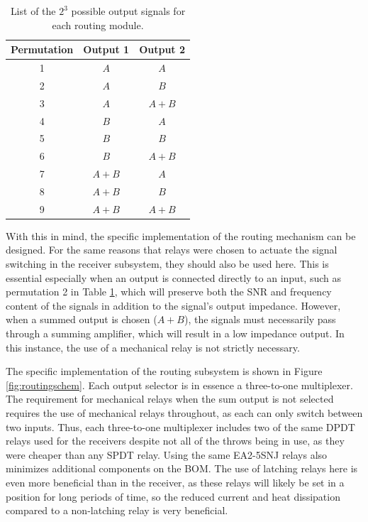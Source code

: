 \documentclass{article}
\begin{document}
	\begin{table}
	\begin{center}
	\begin{tabular}{ |c|c c| }
	\hline
	 Permutation & Output 1 & Output 2 \\ 
	 \hline
	 1 	& $A$ 	& $A$ \\  
	 2 	& $A$ 	& $B$ \\
	 3	& $A$ 	& $A+B$ \\
	 4	& $B$ 	& $A$ \\
	 5	& $B$ 	& $B$ \\
	 6	& $B$ 	& $A+B$ \\
	 7	& $A+B$ & $A$ \\
	 8	& $A+B$ & $B$ \\
	 9	& $A+B$ & $A+B$ \\
	 \hline
	\end{tabular}
	\caption{List of the $2^3$ possible output signals for each routing module.}
	\label{tab:routing_outputs}
	\end{center}
	\end{table}

	With this in mind, the specific implementation of the routing mechanism can be designed.  For the same reasons that relays were chosen to actuate the signal switching in the receiver subsystem, they should also be used here.  This is essential especially when an output is connected directly to an input, such as permutation 2 in Table \ref{tab:routing_outputs}, which will preserve both the SNR and frequency content of the signals in addition to the signal's output impedance.  However, when a summed output is chosen ($A+B$), the signals must necessarily pass through a summing amplifier, which will result in a low impedance output.  In this instance, the use of a mechanical relay is not strictly necessary.

	The specific implementation of the routing subsystem is shown in Figure \ref{fig:routingschem}.  Each output selector is in essence a three-to-one multiplexer.  The requirement for mechanical relays when the sum output is not selected requires the use of mechanical relays throughout, as each can only switch between two inputs.  Thus, each three-to-one multiplexer includes two of the same DPDT relays used for the receivers despite not all of the throws being in use, as they were cheaper than any SPDT relay.  Using the same EA2-5SNJ relays also minimizes additional components on the BOM.  The use of latching relays here is even more beneficial than in the receiver, as these relays will likely be set in a position for long periods of time, so the reduced current and heat dissipation compared to a non-latching relay is very beneficial.
\end{document}
